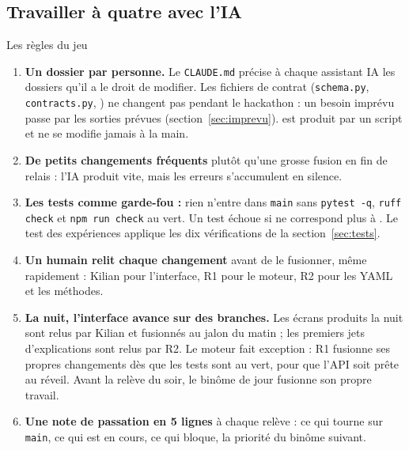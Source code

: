 \documentclass[11pt,a4paper]{article}
\begin{document}
\subsection{Travailler à quatre avec l'IA}
\begin{keybox}{Les règles du jeu}
  \begin{enumerate}[leftmargin=*, nosep]
    \item \textbf{Un dossier par personne.} Le \texttt{CLAUDE.md} précise à chaque assistant IA les dossiers qu'il a le droit de modifier. Les fichiers de contrat (\texttt{schema.py}, \texttt{contracts.py}, ) ne changent pas pendant le hackathon : un besoin imprévu passe par les sorties prévues (section~\ref{sec:imprevu}).  est produit par un script et ne se modifie jamais à la main.
    \item \textbf{De petits changements fréquents} plutôt qu'une grosse fusion en fin de relais : l'IA produit vite, mais les erreurs s'accumulent en silence.
    \item \textbf{Les tests comme garde-fou :} rien n'entre dans \texttt{main} sans \texttt{pytest -q}, \texttt{ruff check} et \texttt{npm run check} au vert. Un test échoue si  ne correspond plus à . Le test des expériences applique les dix vérifications de la section~\ref{sec:tests}.
    \item \textbf{Un humain relit chaque changement} avant de le fusionner, même rapidement : Kilian pour l'interface, R1 pour le moteur, R2 pour les YAML et les méthodes.
    \item \textbf{La nuit, l'interface avance sur des branches.} Les écrans produits la nuit sont relus par Kilian et fusionnés au jalon du matin ; les premiers jets d'explications sont relus par R2. Le moteur fait exception : R1 fusionne ses propres changements dès que les tests sont au vert, pour que l'API soit prête au réveil. Avant la relève du soir, le binôme de jour fusionne son propre travail.
    \item \textbf{Une note de passation en 5 lignes} à chaque relève : ce qui tourne sur \texttt{main}, ce qui est en cours, ce qui bloque, la priorité du binôme suivant.
  \end{enumerate}
\end{keybox}
\end{document}
